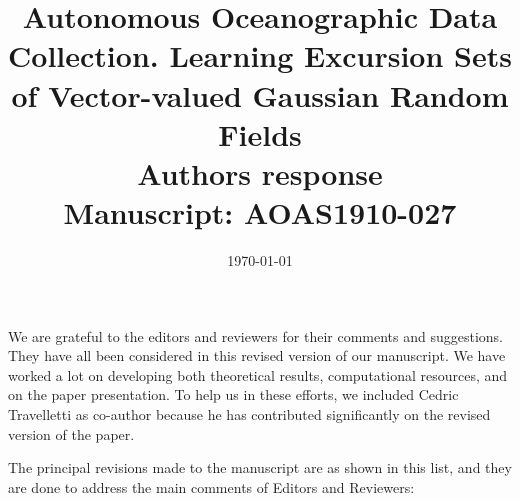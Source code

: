 \documentclass[a4paper]{article}
\newcounter{reviewer}
\begin{document}
\title{Autonomous Oceanographic Data Collection. Learning Excursion Sets of Vector-valued Gaussian Random Fields
  \\\vspace{5mm}
 Authors response
  \\\vspace{5mm}
\small{Manuscript: AOAS1910-027}}
\author{ }

\date{\today}

\maketitle

We are grateful to the editors and reviewers for their comments and
suggestions. They have all been considered in this revised
version of our manuscript. We have worked a lot on developing both theoretical results, computational resources, and on the paper presentation. To help us in these efforts, we included Cedric Travelletti as co-author because he has contributed significantly on the revised version of the paper. 

The principal revisions made to the manuscript are as shown in this list, and they are done to address the main comments of Editors and Reviewers:
\end{document}
